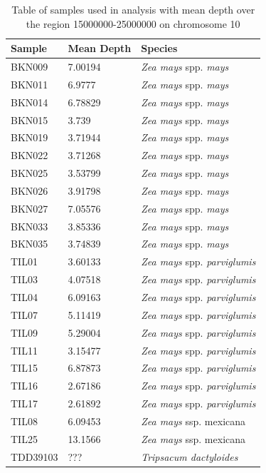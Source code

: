 \begin{table}
\begin{center}
	\begin{tabular} { | p{5cm} | p{5cm} | p{5cm} | }
	\hline
	\textbf{Sample} & \textbf{Mean Depth} & \textbf{Species} \\ \hline \hline
	BKN009 & 7.00194 & {\it Zea mays} spp. {\it mays}\\ \hline
	BKN011 & 6.9777  & {\it Zea mays} spp. {\it mays}\\ \hline
	BKN014 & 6.78829 & {\it Zea mays} spp. {\it mays} \\ \hline
	BKN015 & 3.739 & {\it Zea mays} spp. {\it mays} \\ \hline
	BKN019 & 3.71944 & {\it Zea mays} spp. {\it mays} \\ \hline
	BKN022 & 3.71268 & {\it Zea mays} spp. {\it mays} \\ \hline
	BKN025 & 3.53799 & {\it Zea mays} spp. {\it mays} \\ \hline
	BKN026 & 3.91798 & {\it Zea mays} spp. {\it mays} \\ \hline
	BKN027 & 7.05576 & {\it Zea mays} spp. {\it mays} \\ \hline
	BKN033 & 3.85336 & {\it Zea mays} spp. {\it mays} \\ \hline
	BKN035 & 3.74839 & {\it Zea mays} spp. {\it mays} \\ \hline
	TIL01 & 3.60133 & {\it Zea mays} spp. {\it parviglumis}\\ \hline
	TIL03 & 4.07518 & {\it Zea mays} spp. {\it parviglumis} \\ \hline
	TIL04 & 6.09163 & {\it Zea mays} spp. {\it parviglumis} \\ \hline
	TIL07 & 5.11419 & {\it Zea mays} spp. {\it parviglumis} \\ \hline
	TIL09 & 5.29004 & {\it Zea mays} spp. {\it parviglumis} \\ \hline
	TIL11 & 3.15477 & {\it Zea mays} spp. {\it parviglumis} \\ \hline
	TIL15 & 6.87873 & {\it Zea mays} spp. {\it parviglumis} \\ \hline
	TIL16 & 2.67186 & {\it Zea mays} spp. {\it parviglumis} \\ \hline
	TIL17 & 2.61892 & {\it Zea mays} spp. {\it parviglumis} \\ \hline
	TIL08 & 6.09453 & \textit{Zea mays} ssp. {mexicana} \\ \hline
	TIL25 & 13.1566 & \textit{Zea mays} ssp. {mexicana} \\ \hline
	TDD39103 & ??? & \textit{Tripsacum dactyloides} \\ \hline
	\end{tabular}
	\caption{Table of samples used in analysis with mean depth over the region 15000000-25000000 on chromosome 10}
	\label{tab:samples}
	\end{center}
\end{table}